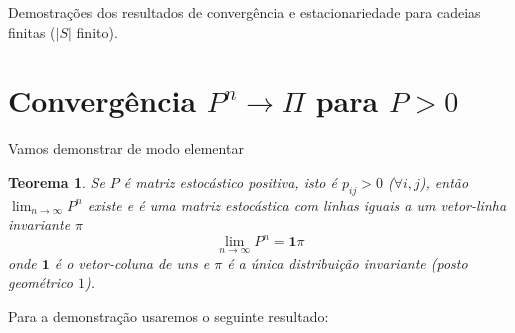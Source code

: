 \documentclass[12pt,letterpaper]{article}
\newtheorem{teorema} {Teorema}
\begin{document}
Demostrações dos resultados de convergência e estacionariedade para
cadeias finitas ($|S|$ finito).

\section{Convergência $P^n\to\Pi$ para $P>0$}

Vamos demonstrar de modo elementar
\begin{teorema}
  Se $P$ é matriz estocástico positiva, isto é $p_{ij}>0$
  ($\forall i,j$), então $\lim_{n\to\infty} P^n$ existe e é uma matriz
  estocástica com linhas iguais a um vetor-linha invariante
  $\mathsf{\pi}$
  $$
  \lim_{n\to\infty} P^n = \mathbf{1}\mathsf{\pi}
  $$
  onde $\mathbf{1}$ é o vetor-coluna de uns e $\pi$ é a única
  distribuição invariante (posto geométrico $1$).
\end{teorema}

Para a demonstração usaremos o seguinte resultado:
\end{document}
